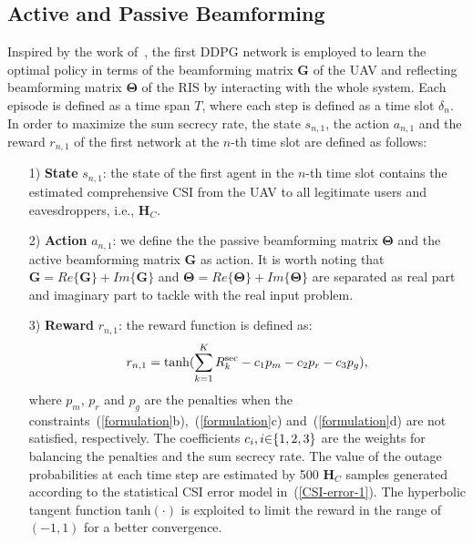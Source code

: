 \documentclass[12pt, draftclsnofoot, onecolumn]{IEEEtran}
\begin{document}
\subsection{Active and Passive Beamforming}
Inspired by the work of~\cite{secure-1}, the first DDPG network is employed to learn the optimal policy in terms of the beamforming matrix $\bm{G}$ of the UAV and reflecting beamforming matrix $\bm{\Theta}$ of the RIS by interacting with the whole system. Each episode is defined as a time span $T$, where each step is defined as a time slot $\delta_n$. In order to maximize the sum secrecy rate, the state $s_{n,1}$, the action $a_{n,1}$ and the reward $r_{n,1}$ of the first network at the $n$-th time slot are defined as follows:
\begin{itemize}
  \item [1)] 
  \textbf{State} $s_{n,1}$: the state of the first agent in the $n$-th time slot contains the estimated comprehensive CSI from the UAV to all legitimate users and eavesdroppers, i.e., ${\bm H}_{C}$.
  \item [2)]
  \textbf{Action} $a_{n,1}$: we define the the passive beamforming matrix ${\bm \Theta}$ and the active beamforming matrix ${\bm G }$ as action. It is worth noting that ${\bm G} = Re\{ {\bm G} \} + Im\{ {\bm G} \}$ and ${\bm \Theta} = Re\{ {\bm \Theta} \} + Im\{ {\bm \Theta} \}$ are separated as real part and imaginary part to tackle with the real input problem.
  \item [3)]
  \textbf{Reward} $r_{n,1}$: the reward function is defined as:
  \begin{equation}\label{reward}
    r_{n,1}={\rm tanh}(\sum_{k=1}^{K}  R_{k}^{\mathrm{sec}}-c_1 p_{m}- c_2 p_{r}-c_3 p_{g}),
  \end{equation}
  where $p_{m}$, $p_{r}$ and $p_{g}$ are the penalties when the constraints~(\ref{formulation}\rm{b}),~(\ref{formulation}\rm{c}) and~(\ref{formulation}\rm{d}) are not satisfied, respectively. The coefficients $c_i,i{\rm \in}\{1,2,3\} $ are the weights for balancing the penalties and the sum secrecy rate. The value of the outage probabilities at each time step are estimated by 500 ${\bm H}_C$ samples generated according to the statistical CSI error model in~(\ref{CSI-error-1}). The hyperbolic tangent function $\text{tanh}(\cdot )$ is exploited to limit the reward in the range of $(-1,1)$ for a better convergence.
\end{itemize}
\end{document}
